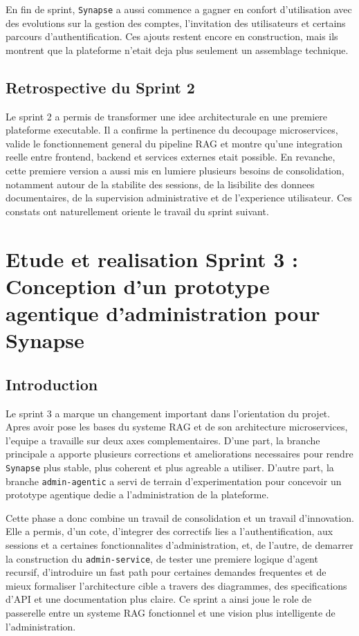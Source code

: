 En fin de sprint, \texttt{Synapse} a aussi commence a gagner en confort d'utilisation avec des evolutions sur la gestion des comptes, l'invitation des utilisateurs et certains parcours d'authentification. Ces ajouts restent encore en construction, mais ils montrent que la plateforme n'etait deja plus seulement un assemblage technique.

\section{Retrospective du Sprint 2}

Le sprint 2 a permis de transformer une idee architecturale en une premiere plateforme executable. Il a confirme la pertinence du decoupage microservices, valide le fonctionnement general du pipeline RAG et montre qu'une integration reelle entre frontend, backend et services externes etait possible. En revanche, cette premiere version a aussi mis en lumiere plusieurs besoins de consolidation, notamment autour de la stabilite des sessions, de la lisibilite des donnees documentaires, de la supervision administrative et de l'experience utilisateur. Ces constats ont naturellement oriente le travail du sprint suivant.

\chapter{Etude et realisation Sprint 3 : Conception d'un prototype agentique d'administration pour Synapse}

\section{Introduction}

Le sprint 3 a marque un changement important dans l'orientation du projet. Apres avoir pose les bases du systeme RAG et de son architecture microservices, l'equipe a travaille sur deux axes complementaires. D'une part, la branche principale a apporte plusieurs corrections et ameliorations necessaires pour rendre \texttt{Synapse} plus stable, plus coherent et plus agreable a utiliser. D'autre part, la branche \texttt{admin-agentic} a servi de terrain d'experimentation pour concevoir un prototype agentique dedie a l'administration de la plateforme.

Cette phase a donc combine un travail de consolidation et un travail d'innovation. Elle a permis, d'un cote, d'integrer des correctifs lies a l'authentification, aux sessions et a certaines fonctionnalites d'administration, et, de l'autre, de demarrer la construction du \texttt{admin-service}, de tester une premiere logique d'agent recursif, d'introduire un fast path pour certaines demandes frequentes et de mieux formaliser l'architecture cible a travers des diagrammes, des specifications d'API et une documentation plus claire. Ce sprint a ainsi joue le role de passerelle entre un systeme RAG fonctionnel et une vision plus intelligente de l'administration.

